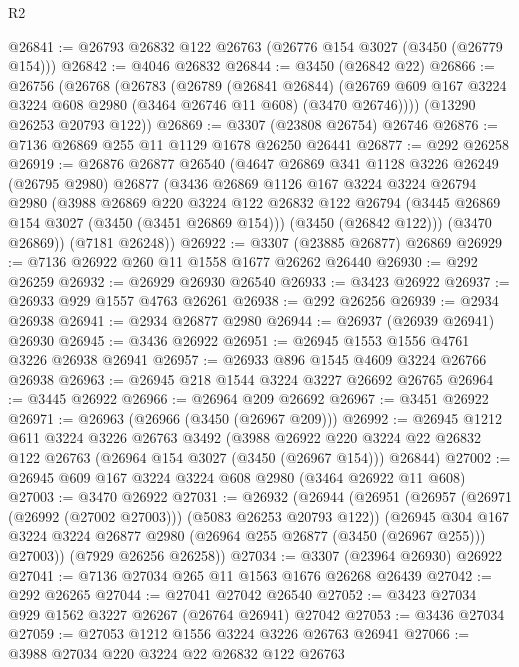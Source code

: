 \begin{lexlean}{R2}
\begin{coremodule}
@26841 := @26793 @26832 @122 @26763 (@26776 @154 @3027 (@3450 (@26779 @154)))
@26842 := @4046 @26832
@26844 := @3450 (@26842 @22)
@26866 := @26756
    (@26768
      (@26783
        (@26789
          (@26841 @26844)
          (@26769 @609 @167 @3224 @3224 @608 @2980 (@3464 @26746 @11 @608) (@3470 @26746))))
      (@13290 @26253 @20793 @122))
@26869 := @3307 (@23808 @26754) @26746
@26876 := @7136 @26869 @255 @11 @1129 @1678 @26250 @26441
@26877 := @292 @26258
@26919 := @26876
    @26877
    @26540
    (@4647
      @26869
      @341
      @1128
      @3226
      @26249
      (@26795 @2980)
      @26877
      (@3436
        @26869
        @1126
        @167
        @3224
        @3224
        @26794
        @2980
        (@3988
          @26869
          @220
          @3224
          @122
          @26832
          @122
          @26794
          (@3445 @26869 @154 @3027 (@3450 (@3451 @26869 @154)))
          (@3450 (@26842 @122)))
        (@3470 @26869))
      (@7181 @26248))
@26922 := @3307 (@23885 @26877) @26869
@26929 := @7136 @26922 @260 @11 @1558 @1677 @26262 @26440
@26930 := @292 @26259
@26932 := @26929 @26930 @26540
@26933 := @3423 @26922
@26937 := @26933 @929 @1557 @4763 @26261
@26938 := @292 @26256
@26939 := @2934 @26938
@26941 := @2934 @26877 @2980
@26944 := @26937 (@26939 @26941) @26930
@26945 := @3436 @26922
@26951 := @26945 @1553 @1556 @4761 @3226 @26938 @26941
@26957 := @26933 @896 @1545 @4609 @3224 @26766 @26938
@26963 := @26945 @218 @1544 @3224 @3227 @26692 @26765
@26964 := @3445 @26922
@26966 := @26964 @209 @26692
@26967 := @3451 @26922
@26971 := @26963 (@26966 (@3450 (@26967 @209)))
@26992 := @26945
    @1212
    @611
    @3224
    @3226
    @26763
    @3492
    (@3988
      @26922
      @220
      @3224
      @22
      @26832
      @122
      @26763
      (@26964 @154 @3027 (@3450 (@26967 @154)))
      @26844)
@27002 := @26945 @609 @167 @3224 @3224 @608 @2980 (@3464 @26922 @11 @608)
@27003 := @3470 @26922
@27031 := @26932
    (@26944
      (@26951
        (@26957 (@26971 (@26992 (@27002 @27003))) (@5083 @26253 @20793 @122))
        (@26945
          @304
          @167
          @3224
          @3224
          @26877
          @2980
          (@26964 @255 @26877 (@3450 (@26967 @255)))
          @27003))
      (@7929 @26256 @26258))
@27034 := @3307 (@23964 @26930) @26922
@27041 := @7136 @27034 @265 @11 @1563 @1676 @26268 @26439
@27042 := @292 @26265
@27044 := @27041 @27042 @26540
@27052 := @3423 @27034 @929 @1562 @3227 @26267 (@26764 @26941) @27042
@27053 := @3436 @27034
@27059 := @27053 @1212 @1556 @3224 @3226 @26763 @26941
@27066 := @3988 @27034 @220 @3224 @22 @26832 @122 @26763

\end{coremodule}
\end{lexlean}
